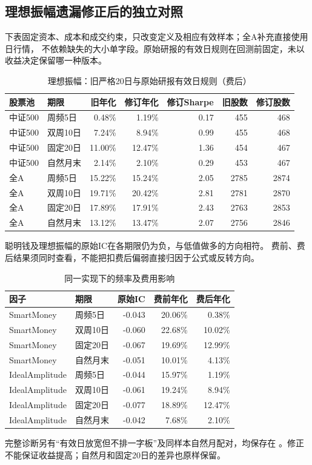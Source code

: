 \documentclass[UTF8,zihao=-4,fontset=fandol]{ctexart}
\begin{document}
\clearpage
\subsection{理想振幅遗漏修正后的独立对照}
下表固定资本、成本和成交约束，只改变定义及相应有效样本；全A补充直接使用日行情，
不依赖缺失的大小单字段。原始研报的有效日规则在回测前固定，未以收益决定保留哪一种版本。
\begin{table}[H]\centering\small
\caption{理想振幅：旧严格20日与原始研报有效日规则（费后）}
\setlength{\tabcolsep}{4pt}
\begin{tabular}{llrrrrr}\toprule
股票池 & 期限 & 旧年化 & 修订年化 & 修订Sharpe & 旧股数 & 修订股数\\\midrule
中证500 & 周频5日 & 0.48\% & 1.19\% & 0.17 & 455 & 468 \\
中证500 & 双周10日 & 7.24\% & 8.94\% & 0.99 & 455 & 468 \\
中证500 & 固定20日 & 11.00\% & 12.47\% & 1.36 & 454 & 467 \\
中证500 & 自然月末 & 2.14\% & 2.10\% & 0.29 & 453 & 467 \\
全A & 周频5日 & 15.22\% & 15.24\% & 2.05 & 2785 & 2874 \\
全A & 双周10日 & 19.71\% & 20.42\% & 2.81 & 2781 & 2870 \\
全A & 固定20日 & 17.89\% & 17.91\% & 2.43 & 2763 & 2853 \\
全A & 自然月末 & 13.12\% & 13.47\% & 2.07 & 2756 & 2846 \\
\bottomrule
\end{tabular}\end{table}

聪明钱及理想振幅的原始IC在各期限仍为负，与低值做多的方向相符。
费前、费后结果须同时查看，不能把扣费后偏弱直接归因于公式或反转方向。
\begin{table}[H]\centering\small
\caption{同一实现下的频率及费用影响}
\begin{tabular}{llrrr}\toprule
因子 & 期限 & 原始IC & 费前年化 & 费后年化\\\midrule
SmartMoney & 周频5日 & -0.043 & 20.06\% & 0.38\% \\
SmartMoney & 双周10日 & -0.060 & 22.68\% & 10.02\% \\
SmartMoney & 固定20日 & -0.067 & 19.69\% & 12.99\% \\
SmartMoney & 自然月末 & -0.051 & 10.01\% & 4.13\% \\
IdealAmplitude & 周频5日 & -0.044 & 15.97\% & 1.19\% \\
IdealAmplitude & 双周10日 & -0.061 & 19.24\% & 8.94\% \\
IdealAmplitude & 固定20日 & -0.077 & 18.89\% & 12.47\% \\
IdealAmplitude & 自然月末 & -0.042 & 7.68\% & 2.10\% \\
\bottomrule
\end{tabular}\end{table}
完整诊断另有“有效日放宽但不排一字板”及同样本自然月配对，均保存在
。修正不能保证收益提高；自然月和固定20日的差异也原样保留。
\end{document}
